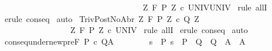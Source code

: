 \begin{isabellebody}
\ \ \ \ \ \ \ \ \ \ \ \ \ \ \ \ \ {\isasymLongrightarrow}\isanewline
\ \ \ \ \ \ \ \ \ \ \ \ \ \ \ \ \ {\isasymforall}Z{\isachardot}\ {\isasymGamma}{\isacharcomma}{\isasymTheta}{\isasymturnstile}\isactrlbsub {\isacharslash}F\isactrlesub \ {\isacharparenleft}P{\isacharprime}\ Z{\isacharparenright}\ c\ UNIV{\isacharcomma}UNIV{\isachardoublequoteclose}\isanewline
%
\isadelimproof
%
\endisadelimproof
%
\isatagproof
{}\isamarkupfalse%
\ {\isacharparenleft}rule\ allI{\isacharparenright}\isanewline
{}\isamarkupfalse%
\ {\isacharparenleft}erule\ conseq{\isacharparenright}\isanewline
{}\isamarkupfalse%
\ auto\isanewline
{}\isamarkupfalse%
%
\endisatagproof
{\isafoldproof}%
%
\isadelimproof
\isanewline
%
\endisadelimproof
\isanewline
{}\isamarkupfalse%
\ TrivPostNoAbr{\isacharcolon}\ {\isachardoublequoteopen}{\isasymforall}Z{\isachardot}\ {\isasymGamma}{\isacharcomma}{\isasymTheta}{\isasymturnstile}\isactrlbsub {\isacharslash}F\isactrlesub \ {\isacharparenleft}P{\isacharprime}\ Z{\isacharparenright}\ c\ {\isacharparenleft}Q{\isacharprime}\ Z{\isacharparenright}{\isacharcomma}{\isacharbraceleft}{\isacharbraceright}\isanewline
\ \ \ \ \ \ \ \ \ \ \ \ \ \ \ \ \ {\isasymLongrightarrow}\isanewline
\ \ \ \ \ \ \ \ \ \ \ \ \ \ \ \ \ {\isasymforall}Z{\isachardot}\ {\isasymGamma}{\isacharcomma}{\isasymTheta}{\isasymturnstile}\isactrlbsub {\isacharslash}F\isactrlesub \ {\isacharparenleft}P{\isacharprime}\ Z{\isacharparenright}\ c\ UNIV{\isacharcomma}{\isacharbraceleft}{\isacharbraceright}{\isachardoublequoteclose}\isanewline
%
\isadelimproof
%
\endisadelimproof
%
\isatagproof
{}\isamarkupfalse%
\ {\isacharparenleft}rule\ allI{\isacharparenright}\isanewline
{}\isamarkupfalse%
\ {\isacharparenleft}erule\ conseq{\isacharparenright}\isanewline
{}\isamarkupfalse%
\ auto\isanewline
{}\isamarkupfalse%
%
\endisatagproof
{\isafoldproof}%
%
\isadelimproof
\isanewline
%
\endisadelimproof
\isanewline
{}\isamarkupfalse%
\ conseq{\isacharunderscore}under{\isacharunderscore}new{\isacharunderscore}pre{\isacharcolon}{\isachardoublequoteopen}{\isasymlbrakk}{\isasymGamma}{\isacharcomma}{\isasymTheta}{\isasymturnstile}\isactrlbsub {\isacharslash}F\ \isactrlesub P{\isacharprime}\ c\ Q{\isacharprime}{\isacharcomma}A{\isacharprime}{\isacharsemicolon}\isanewline
\ \ \ \ \ \ \ \ {\isasymforall}s\ {\isasymin}\ P{\isachardot}\ s\ {\isasymin}\ P{\isacharprime}\ {\isasymand}\ Q{\isacharprime}\ {\isasymsubseteq}\ Q\ {\isasymand}\ A{\isacharprime}\ {\isasymsubseteq}\ A{\isasymrbrakk}\isanewline

\end{isabellebody}
